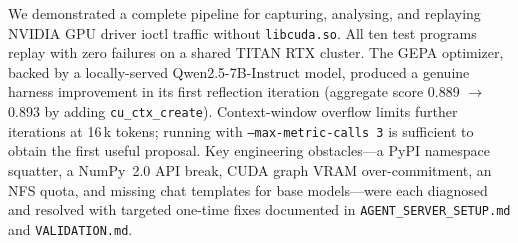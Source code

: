 \documentclass[11pt,a4paper]{article}
\begin{document}
We demonstrated a complete pipeline for capturing, analysing, and replaying
NVIDIA GPU driver ioctl traffic without \texttt{libcuda.so}.
All ten test programs replay with zero failures on a shared TITAN RTX cluster.
The GEPA optimizer, backed by a locally-served Qwen2.5-7B-Instruct model,
produced a genuine harness improvement in its first reflection iteration
(aggregate score 0.889 $\to$ 0.893 by adding \texttt{cu\_ctx\_create}).
Context-window overflow limits further iterations at 16\,k tokens; running
with \texttt{--max-metric-calls 3} is sufficient to obtain the first useful
proposal.
Key engineering obstacles---a PyPI namespace squatter, a NumPy~2.0 API break,
CUDA graph VRAM over-commitment, an NFS quota, and missing chat templates
for base models---were each diagnosed and resolved with targeted one-time
fixes documented in \texttt{AGENT\_SERVER\_SETUP.md} and \texttt{VALIDATION.md}.
\end{document}

